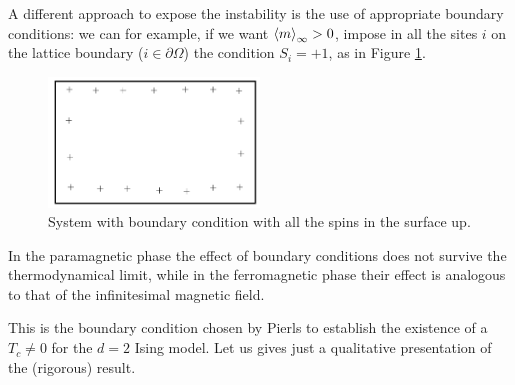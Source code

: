 \documentclass[../../Main/Main.tex]{subfiles}
\begin{document}
A different approach to expose the instability is the use of appropriate boundary conditions:
we can for example, if we want \( \expval{m}_ \infty  > 0\), impose in all the sites \(i\) on the lattice boundary (\( i \in \partial{\Omega }  \)) the condition
\( S_i = +1 \),  as in Figure \ref{fig:10_1}.

\begin{figure}[H]
\centering
\includegraphics[width=0.5\textwidth]{./img/1.pdf}
\caption{\label{fig:10_1} System with boundary condition with all the spins in the surface up.}
\end{figure}

In the paramagnetic phase the effect of boundary conditions does not survive the thermodynamical limit, while in the ferromagnetic phase their effect is analogous to that of the infinitesimal magnetic field.

This is the boundary condition chosen by Pierls to establish the existence of a \( T_c \neq 0 \) for the \(d=2\) Ising model.
Let us gives just a qualitative presentation  of the (rigorous) result. 
\end{document}
